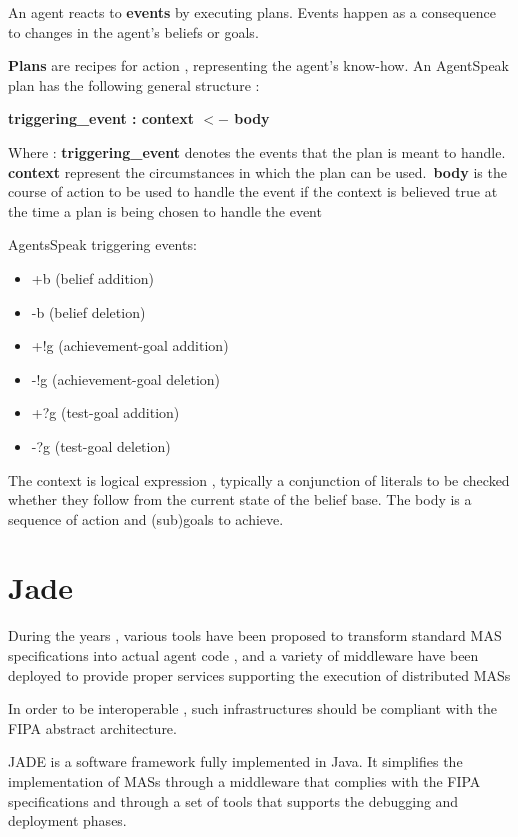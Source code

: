 \documentclass{article}
\begin{document}
An agent reacts to \textbf{events} by executing plans. Events happen as a consequence to changes in the agent's beliefs or goals.

\textbf{Plans} are recipes for action , representing the agent's know-how. An AgentSpeak plan has the following general structure : 

\textbf{triggering\_event : context $<-$ body}

Where : \textbf{triggering\_event} denotes the events that the plan is meant to handle.
\textbf{context} represent the circumstances in which the plan can be used.\
\textbf{body} is the course of action to be used to handle the event if the context is believed true at the time a plan is being chosen to handle the event

AgentsSpeak triggering events:

\begin{itemize}
    \item +b (belief addition)
    \item -b (belief deletion)
    \item +!g (achievement-goal addition)
    \item -!g (achievement-goal deletion)
    \item +?g (test-goal addition)
    \item -?g (test-goal deletion)
\end{itemize}

The context is logical expression , typically a conjunction of literals to be checked whether they follow from the current state of the belief base.
The body is a sequence of action and (sub)goals to achieve.

\section{Jade}

During the years , various tools have been proposed to transform standard MAS specifications into actual agent code , and a variety of middleware have been deployed to provide proper services supporting the execution of distributed MASs

In order to be interoperable , such infrastructures should be compliant with the FIPA abstract architecture.

JADE is a software framework fully implemented in Java. It simplifies the implementation of MASs through a middleware that complies with the FIPA specifications and through a set of tools that supports the debugging and deployment phases.
\end{document}
